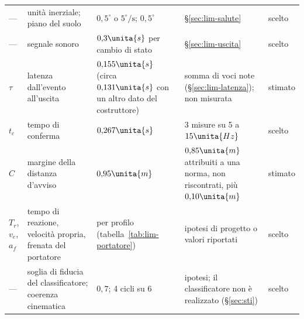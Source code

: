 \begin{table}[H]
\begin{tabularx}{\linewidth}{@{}p{1.25cm}Lp{3.5cm}Lp{1.2cm}@{}}
--- & unità inerziale; piano del suolo & $0{,}5^\circ$ o $5^\circ/\mathrm{s}$; $0{,}5^\circ$ & \S\ref{sec:lim-salute} & scelto\\
--- & segnale sonoro & $0{,}3\unita{s}$ per cambio di stato & \S\ref{sec:lim-uscita} & scelto\\
$\tau$ & latenza dall'evento all'uscita & $0{,}155\unita{s}$ (circa $0{,}131\unita{s}$ con un altro dato del costruttore) & somma di voci note (\S\ref{sec:lim-latenza}); non misurata & stimato\\
$t_c$ & tempo di conferma & $0{,}267\unita{s}$ & 3 misure su 5 a $15\unita{Hz}$ & scelto\\
$C$ & margine della distanza d'avviso & $0{,}95\unita{m}$ & $0{,}85\unita{m}$ attribuiti a una norma, non riscontrati, più $0{,}10\unita{m}$ & stimato\\
$T_r$, $v_e$, $a_f$ & tempo di reazione, velocità propria, frenata del portatore & per profilo (tabella~\ref{tab:lim-portatore}) & ipotesi di progetto o valori riportati & scelto\\
--- & soglia di fiducia del classificatore; coerenza cinematica & $0{,}7$; 4 cicli su 6 & ipotesi; il classificatore non è realizzato (\S\ref{sec:sti}) & scelto\\
\bottomrule
\end{tabularx}
\end{table}
